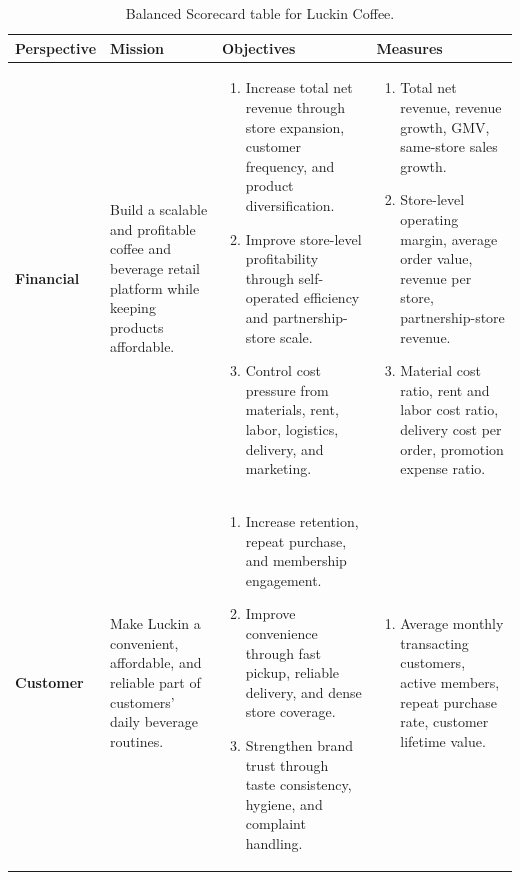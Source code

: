 \documentclass[12pt,a4paper]{article}
\renewcommand{\arraystretch}{1.22}
\begin{document}
\begin{landscape}
\thispagestyle{empty}
\begin{table}[H]
\centering
\scriptsize
\renewcommand{\arraystretch}{1.12}
\caption{Balanced Scorecard table for Luckin Coffee.}
\begin{tabularx}{\linewidth}{P{2.8cm}P{5.1cm}P{8.0cm}Y}
\toprule
\textbf{Perspective} & \textbf{Mission} & \textbf{Objectives} & \textbf{Measures} \\
\midrule
\textbf{Financial} &
Build a scalable and profitable coffee and beverage retail platform while keeping products affordable. &
\begin{enumerate}[leftmargin=*,nosep]
  \item Increase total net revenue through store expansion, customer frequency, and product diversification.
  \item Improve store-level profitability through self-operated efficiency and partnership-store scale.
  \item Control cost pressure from materials, rent, labor, logistics, delivery, and marketing.
\end{enumerate} &
\begin{enumerate}[leftmargin=*,nosep]
  \item Total net revenue, revenue growth, GMV, same-store sales growth.
  \item Store-level operating margin, average order value, revenue per store, partnership-store revenue.
  \item Material cost ratio, rent and labor cost ratio, delivery cost per order, promotion expense ratio.
\end{enumerate} \\
\midrule
\textbf{Customer} &
Make Luckin a convenient, affordable, and reliable part of customers' daily beverage routines. &
\begin{enumerate}[leftmargin=*,nosep]
  \item Increase retention, repeat purchase, and membership engagement.
  \item Improve convenience through fast pickup, reliable delivery, and dense store coverage.
  \item Strengthen brand trust through taste consistency, hygiene, and complaint handling.
\end{enumerate} &
\begin{enumerate}[leftmargin=*,nosep]
  \item Average monthly transacting customers, active members, repeat purchase rate, customer lifetime value.

\end{enumerate}
\end{tabularx}
\end{table}
\end{landscape}
\end{document}
